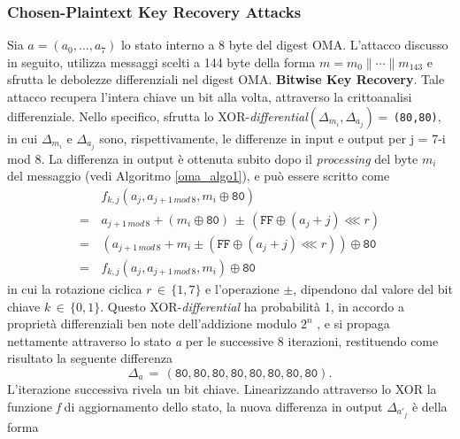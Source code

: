 \subsubsection{Chosen-Plaintext Key Recovery Attacks}
Sia $a=\left(a_0,\ldots,a_7\right)$ lo stato interno a 8 byte del digest OMA. L'attacco discusso in seguito, utilizza messaggi scelti a 144 byte della forma $m=m_0 \|\cdots \|m_{143}$ e sfrutta le debolezze differenziali nel digest OMA.
\newline \newline
\textbf{Bitwise Key Recovery}.
Tale attacco recupera l'intera chiave un bit alla volta, attraverso la crittoanalisi differenziale. Nello specifico, sfrutta lo XOR-\textit{differential}$\left(\Delta_{m_i}, \Delta_{a_j}\right) =\,$\texttt{(80,80)}, in cui $\Delta_{m_i}$ e $\Delta_{a_j}$ sono, rispettivamente, le differenze in input e output per j = 7-i mod 8. La differenza in output è ottenuta subito dopo il \textit{processing} del byte $m_i$ del messaggio (vedi Algoritmo \ref{oma_algo1}), e può essere scritto come 
\begin{equation*}
\begin{split}
&f_{k,j}\left(a_j, a_{j+1 \, mod \, 8}, m_i \oplus \texttt{80} \right) \\
=\,&a_{j+1\,mod\,8} + \left( m_i \oplus \texttt{80} \right) \, \pm \, \left(\texttt{FF} \oplus (a_j+j) \lll r \right) \\
=\,&\left(a_{j+1\,mod\,8} + m_i \pm ( \texttt{FF} \oplus (a_j+j) \lll r)\right)\oplus \texttt{80} \\
=\,&f_{k,j}\left(a_j, a_{j+1 \, mod \, 8}, m_i\right) \oplus \texttt{80} 
\end{split}
\end{equation*}
in cui la rotazione ciclica $r\,\in \, \{1,7\}$ e l'operazione $\pm$, dipendono dal valore del bit chiave $k \, \in \, \{0,1\}$. Questo XOR-\textit{differential} ha probabilità 1, in accordo a proprietà differenziali ben note dell'addizione modulo $2^n$ \cite{diff}, e si propaga nettamente attraverso lo stato \textit{a} per le successive 8 iterazioni, restituendo come risultato la seguente differenza
\begin{equation*}
\Delta_a \, = \, (\texttt{80},\texttt{80},\texttt{80},\texttt{80},\texttt{80},\texttt{80},\texttt{80},\texttt{80}).
\end{equation*}
L'iterazione successiva rivela un bit chiave. Linearizzando attraverso lo XOR la funzione \textit{f} di aggiornamento dello stato, la nuova differenza in output $\Delta_{a'_j}$ è della forma

